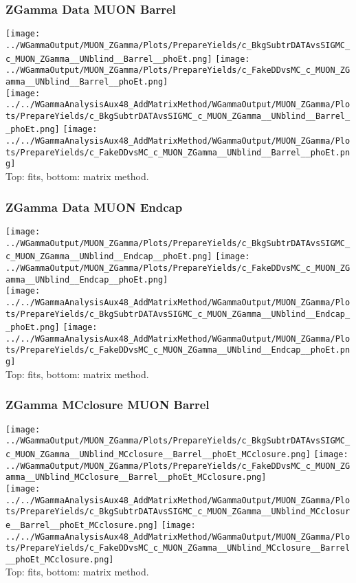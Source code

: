 \documentclass{beamer}
\begin{document}
\begin{frame}\frametitle{ZGamma Data MUON Barrel}
  \texttt{[image: ../WGammaOutput/MUON\_ZGamma/Plots/PrepareYields/c\_BkgSubtrDATAvsSIGMC\_c\_MUON\_ZGamma\_\_UNblind\_\_Barrel\_\_phoEt.png]} \texttt{[image: ../WGammaOutput/MUON\_ZGamma/Plots/PrepareYields/c\_FakeDDvsMC\_c\_MUON\_ZGamma\_\_UNblind\_\_Barrel\_\_phoEt.png]}\\
  \texttt{[image: ../../WGammaAnalysisAux48\_AddMatrixMethod/WGammaOutput/MUON\_ZGamma/Plots/PrepareYields/c\_BkgSubtrDATAvsSIGMC\_c\_MUON\_ZGamma\_\_UNblind\_\_Barrel\_\_phoEt.png]} \texttt{[image: ../../WGammaAnalysisAux48\_AddMatrixMethod/WGammaOutput/MUON\_ZGamma/Plots/PrepareYields/c\_FakeDDvsMC\_c\_MUON\_ZGamma\_\_UNblind\_\_Barrel\_\_phoEt.png]}\\
  \scriptsize Top: fits, bottom: matrix method.
\end{frame}

\begin{frame}\frametitle{ZGamma Data MUON Endcap}
  \texttt{[image: ../WGammaOutput/MUON\_ZGamma/Plots/PrepareYields/c\_BkgSubtrDATAvsSIGMC\_c\_MUON\_ZGamma\_\_UNblind\_\_Endcap\_\_phoEt.png]} \texttt{[image: ../WGammaOutput/MUON\_ZGamma/Plots/PrepareYields/c\_FakeDDvsMC\_c\_MUON\_ZGamma\_\_UNblind\_\_Endcap\_\_phoEt.png]}\\
  \texttt{[image: ../../WGammaAnalysisAux48\_AddMatrixMethod/WGammaOutput/MUON\_ZGamma/Plots/PrepareYields/c\_BkgSubtrDATAvsSIGMC\_c\_MUON\_ZGamma\_\_UNblind\_\_Endcap\_\_phoEt.png]} \texttt{[image: ../../WGammaAnalysisAux48\_AddMatrixMethod/WGammaOutput/MUON\_ZGamma/Plots/PrepareYields/c\_FakeDDvsMC\_c\_MUON\_ZGamma\_\_UNblind\_\_Endcap\_\_phoEt.png]}\\
  \scriptsize Top: fits, bottom: matrix method.
\end{frame}

\begin{frame}\frametitle{ZGamma MCclosure MUON Barrel}
  \texttt{[image: ../WGammaOutput/MUON\_ZGamma/Plots/PrepareYields/c\_BkgSubtrDATAvsSIGMC\_c\_MUON\_ZGamma\_\_UNblind\_MCclosure\_\_Barrel\_\_phoEt\_MCclosure.png]} \texttt{[image: ../WGammaOutput/MUON\_ZGamma/Plots/PrepareYields/c\_FakeDDvsMC\_c\_MUON\_ZGamma\_\_UNblind\_MCclosure\_\_Barrel\_\_phoEt\_MCclosure.png]}\\
  \texttt{[image: ../../WGammaAnalysisAux48\_AddMatrixMethod/WGammaOutput/MUON\_ZGamma/Plots/PrepareYields/c\_BkgSubtrDATAvsSIGMC\_c\_MUON\_ZGamma\_\_UNblind\_MCclosure\_\_Barrel\_\_phoEt\_MCclosure.png]} \texttt{[image: ../../WGammaAnalysisAux48\_AddMatrixMethod/WGammaOutput/MUON\_ZGamma/Plots/PrepareYields/c\_FakeDDvsMC\_c\_MUON\_ZGamma\_\_UNblind\_MCclosure\_\_Barrel\_\_phoEt\_MCclosure.png]}\\
  \scriptsize Top: fits, bottom: matrix method.
\end{frame}
\end{document}
